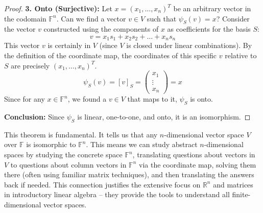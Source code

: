 \documentclass[11pt, letterpaper]{article}
\theoremstyle{mytheoremstyle}
\theoremstyle{mydefinitionstyle}
\theoremstyle{myremarkstyle}
\newcommand{\F}{\mathbb{F}}
\newcommand{\R}{\mathbb{R}}
\newcommand{\coord}[2]{[#1]_{#2}} %
\begin{document}
\begin{proof}
\textbf{3. Onto (Surjective):}
Let $x = (x_1, \dots, x_n)^T$ be an arbitrary vector in the codomain $\F^n$. Can we find a vector $v \in V$ such that $\psi_S(v) = x$?
Consider the vector $v$ constructed using the components of $x$ as coefficients for the basis $S$:
\[ v = x_1 s_1 + x_2 s_2 + \dots + x_n s_n \]
This vector $v$ is certainly in $V$ (since $V$ is closed under linear combinations). By the definition of the coordinate map, the coordinates of this specific $v$ relative to $S$ are precisely $(x_1, \dots, x_n)^T$.
\[ \psi_S(v) = \coord{v}{S} = \begin{pmatrix} x_1 \\ \vdots \\ x_n \end{pmatrix} = x \]
Since for any $x \in \F^n$, we found a $v \in V$ that maps to it, $\psi_S$ is onto.

\textbf{Conclusion:} Since $\psi_S$ is linear, one-to-one, and onto, it is an isomorphism.
\end{proof}

This theorem is fundamental. It tells us that any $n$-dimensional vector space $V$ over $\F$ is isomorphic to $\F^n$. This means we can study abstract $n$-dimensional spaces by studying the concrete space $\F^n$, translating questions about vectors in $V$ to questions about column vectors in $\F^n$ via the coordinate map, solving them there (often using familiar matrix techniques), and then translating the answers back if needed. This connection justifies the extensive focus on $\R^n$ and matrices in introductory linear algebra – they provide the tools to understand all finite-dimensional vector spaces.
\end{document}
